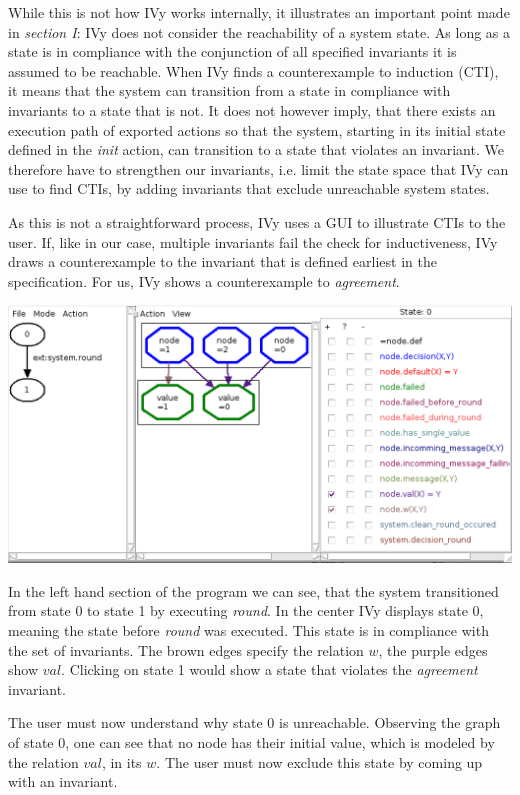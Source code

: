 \documentclass[fleqn]{article}
\begin{document}
While this is not how IVy works internally, it illustrates an important point made in \textit{section I}: IVy does not consider the reachability of a system state. As long as a state is in compliance with the conjunction of all specified invariants it is assumed to be reachable. When IVy finds a counterexample to induction (CTI), it means that the system can transition from a state in compliance with invariants to a state that is not. It does not however imply, that there exists an execution path of exported actions so that the system, starting in its initial state defined in the \textit{init} action, can transition to a state that violates an invariant. We therefore have to strengthen our invariants, i.e. limit the state space that IVy can use to find CTIs, by adding invariants that exclude unreachable system states.

As this is not a straightforward process, IVy uses a GUI to illustrate CTIs to the user. If, like in our case, multiple invariants fail the check for inductiveness, IVy draws a counterexample to the invariant that is defined earliest in the specification. For us, IVy shows a counterexample to \textit{agreement}.

\noindent\includegraphics[width=\textwidth]{gui.png}

\noindent In the left hand section of the program we can see, that the system transitioned from state 0
to state 1 by executing \textit{round}. In the center IVy displays state 0, meaning the state
before \textit{round} was executed. This state is in compliance with the set of invariants.
The brown edges specify the relation $w$, the purple edges show $val$.
Clicking on state 1 would show a state that violates the \textit{agreement} invariant.

The user must now understand why state 0 is unreachable.
Observing the graph of state 0, one can see that no node has their initial value, which is modeled by the relation $val$,
in its $w$. The user must now exclude this state by coming up with an invariant.
\end{document}
